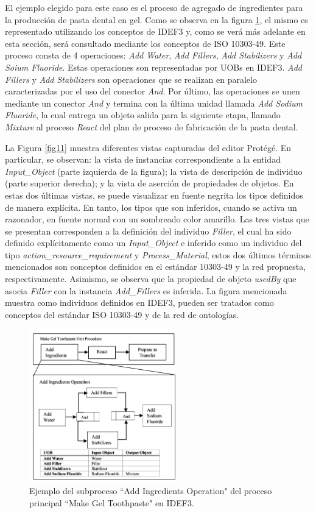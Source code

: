 \documentclass[journal]{IEEEtran}
\begin{document}
El ejemplo elegido para este caso es el proceso de agregado de ingredientes para la producci\'on de pasta dental en gel. Como se observa en la figura \ref{fig10}, el mismo es representado utilizando los conceptos de IDEF3 y, como se ver\'a m\'as adelante en esta secci\'on, ser\'a consultado mediante los conceptos de ISO 10303-49. Este proceso consta de 4 operaciones: \emph{Add Water}, \emph{Add Fillers}, \emph{Add Stabilizers} y \emph{Add Soium Fluoride}. Estas operaciones son representadas por UOBs en IDEF3. \emph{Add Fillers} y \emph{Add Stabilizers} son operaciones que se realizan en paralelo caracterizadas por el uso del conector \emph{And}. Por \'ultimo, las operaciones se unen mediante un conector \emph{And} y termina con la \'ultima unidad llamada \emph{Add Sodium Fluoride}, la cual entrega un objeto salida para la siguiente etapa, llamado \emph{Mixture} al proceso \emph{React} del plan de proceso de fabricaci\'on de la pasta dental.

La Figura \ref{fig11} muestra diferentes vistas capturadas del editor Prot\'eg\'e. En particular, se observan: la vista de instancias correspondiente a la entidad \emph{Input\_Object} (parte izquierda de la figura); la vista de descripci\'on de individuo (parte superior derecha); y la vista de aserci\'on de propiedades de objetos. En estas dos \'ultimas vistas, se puede visualizar en fuente negrita los tipos definidos de manera expl\'icita. En tanto, los tipos que son inferidos, cuando se activa un razonador, en fuente normal con un sombreado color amarillo.  Las tres vistas que se presentan corresponden a la definici\'on del individuo \emph{Filler}, el cual ha sido definido expl\'icitamente como un \emph{Input\_Object} e inferido como un individuo del tipo \emph{action\_resource\_requirement} y \emph{Process\_Material}, estos dos \'ultimos t\'erminos mencionados son conceptos definidos en el est\'andar 10303-49 y la red propuesta, respectivamente. Asimismo, se observa que la propiedad de objeto \emph{usedBy} que asocia \emph{Filler} con la instancia \emph{Add\_Fillers} es inferida. La figura mencionada muestra como individuos definidos en IDEF3, pueden ser tratados como conceptos del est\'andar ISO 10303-49 y de la red de ontolog\'ias.


\begin{figure}[!t]
\centering
\includegraphics[width=2.5in]{figures/figure10.png}
\caption{Ejemplo del subproceso ``Add Ingredients Operation" del proceso principal ``Make Gel Toothpaste" en IDEF3.}
\label{fig10}
\end{figure}
\end{document}
